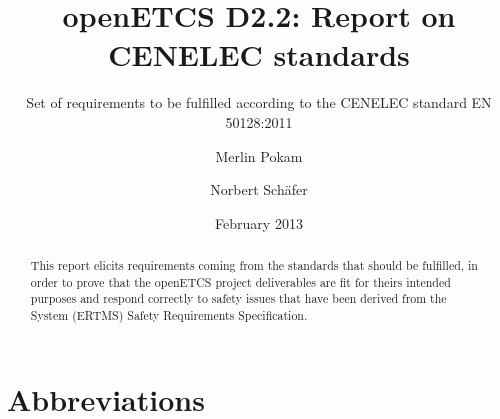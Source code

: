 \documentclass{template/openetcs_report}
\begin{document}
\frontmatter
{}




\title{openETCS D2.2: Report on CENELEC standards}

\subtitle{Set of requirements to be fulfilled according to the CENELEC standard EN 50128:2011}

\date{February 2013}

\author{Merlin Pokam \and Norbert Sch\"afer}






\begin{abstract}
This report elicits requirements coming from the standards that should be fulfilled, in order to prove that the openETCS project deliverables are fit for theirs intended purposes and respond correctly to safety issues that have been derived from the System (ERTMS) Safety Requirements Specification.
\end{abstract}

\maketitle
\tableofcontents
\listoffiguresandtables




\chapter{Abbreviations}
\end{document}
